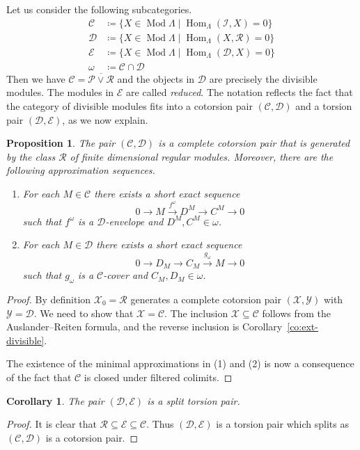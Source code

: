 \documentclass[a4paper]{amsart}
\theoremstyle{plain}
\newtheorem{prop}[thm]{Proposition}
\newtheorem{cor}[thm]{Corollary}
\theoremstyle{definition}
\theoremstyle{remark}
\numberwithin{equation}{section}
\newcommand{\Hom}{\operatorname{Hom}}
\newcommand{\Mod}{\operatorname{Mod}}
\def\C{\mathcal C}
\def\D{\mathcal D}
\def\E{\mathcal E}
\def\I{\mathcal I}
\def\P{\mathcal P}
\def\R{\mathcal R}
\def\X{\mathcal X}
\def\Y{\mathcal Y}
\def\La{\Lambda}
\begin{document}
Let us consider the following subcategories.
\begin{align*}
  \C&\coloneqq\{X\in\Mod\La\mid\Hom_\Lambda(\I,X)=0\}\\
  \D&\coloneqq\{X\in\Mod\La\mid\Hom_\Lambda(X,\R)=0\}\\
  \E&\coloneqq\{X\in\Mod\La\mid\Hom_\Lambda(\D,X)=0\}\\
  \omega&\coloneqq\C\cap\D
\end{align*}
Then we have $\C =\overline{\P\vee\R}$ and the objects in $\D$ are
precisely the divisible modules. The modules in $\E$ are called
\emph{reduced}. The notation reflects the fact that the category of
divisible modules fits into a cotorsion pair  $(\C,\D)$ and a torsion
pair  $(\D,\E)$, as we now explain. 


\begin{prop} 
  The pair $(\C,\D)$ is a complete cotorsion pair that is generated by the
  class $\R$ of finite dimensional regular modules. Moreover, there
  are the following approximation sequences.
\begin{enumerate}
\item For each $M\in\C$ there exists a short exact sequence
\[ 0\to M\xrightarrow{f^\omega} D^M\to C^M\to 0\]  such that
$f^\omega$ is a $\D$-envelope and $D^M,C^M\in \omega$.
\item For each $M\in\D$ there exists a short exact sequence
\[ 0\to D_M \to C_M\xrightarrow{g_\omega} M\to 0\] such that
$g_\omega$
is a $\C$-cover and $C_M,D_M\in\omega$.
\end{enumerate}
\end{prop}
\begin{proof}
  By definition $\X_0=\R$ generates a complete cotorsion pair $(\X,\Y)$
  with $\Y=\D$. We need to show that $\X=\C$. The inclusion
  $\X\subseteq\C$ follows from the Auslander--Reiten formula,
  and the reverse inclusion is Corollary~\ref{co:ext-divisible}.

The existence of the minimal approximations in (1) and (2) is now a consequence of the fact that
 $\C$ is closed under filtered colimits.
\end{proof}

\begin{cor}
  The pair $(\D,\E)$ is a split torsion pair.
\end{cor}
\begin{proof}
It is clear that  $\R\subseteq\E\subseteq\C$. Thus $(\D,\E)$ is a
torsion pair which splits as $(\C,\D)$ is a cotorsion pair.
\end{proof}
\end{document}
